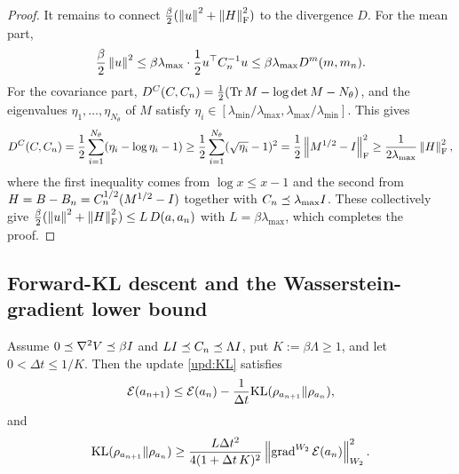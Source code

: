 \begin{proof}
    It remains to connect $\tfrac\beta2(\left\lVert u\right\rVert^2+\left\lVert H\right\rVert_{\mathrm{F}}^2)$ to the divergence $D$. For
    the mean part,
    \begin{equation*}
        \frac\beta2\left\lVert u\right\rVert^2
        \leq\beta\lambda_{\max}\cdot\frac12u^\top C_n^{-1}u
        \leq\beta\lambda_{\max}D^m(m,m_n).
    \end{equation*}
    For the covariance part, $D^C(C,C_n)=\tfrac12(\operatorname{Tr} M-\log\det M-N_\theta)$, and the
    eigenvalues $\eta_1,\ldots,\eta_{N_\theta}$ of $M$ satisfy
    $\eta_i\in[\lambda_{\min}/\lambda_{\max},\lambda_{\max}/\lambda_{\min}]$. This gives
    \begin{equation*}
        D^C(C,C_n)
        =\frac12\sum_{i=1}^{N_\theta}(\eta_i-\log\eta_i-1)
        \geq\frac12\sum_{i=1}^{N_\theta}(\sqrt{\eta_i}-1)^2
        =\frac12\left\lVert M^{1/2}-I\right\rVert_{\mathrm{F}}^2
        \geq\frac1{2\lambda_{\max}}\left\lVert H\right\rVert_{\mathrm{F}}^2,
    \end{equation*}
    where the first inequality comes from $\log x\leq x-1$ and the second from
    $H=B-B_n=C_n^{1/2}(M^{1/2}-I)$ together with $C_n\preceq\lambda_{\max}I$. These
    collectively give
    $\tfrac\beta2(\left\lVert u\right\rVert^2+\left\lVert H\right\rVert_{\mathrm{F}}^2)\leq L\,D(a,a_n)$ with $L=\beta\lambda_{\max}$,
    which completes the proof.
\end{proof}

\subsection{Forward-KL descent and the Wasserstein-gradient lower bound}

\begin{proposition}\label{prop:onestep-KL}
    Assume $0\preceq\nabla^2V\preceq\beta I$ and $LI\preceq C_n\preceq\Lambda I$, put
    $K:=\beta\Lambda\geq1$, and let $0<\Delta t\leq1/K$. Then the update \eqref{upd:KL}
    satisfies
    \begin{equation*}
        \mathcal{E}(a_{n+1})\leq\mathcal{E}(a_n)-\frac1{\Delta t}\mathrm{KL}(\rho_{a_{n+1}}\|\rho_{a_n}),
    \end{equation*}
    and
    \begin{equation*}
        \mathrm{KL}(\rho_{a_{n+1}}\|\rho_{a_n})
        \geq
        \frac{L\Delta t^2}{4(1+\Delta t\,K)^2}
        \left\lVert \operatorname{grad}^{W_2}\mathcal{E}(a_n)\right\rVert_{W_2}^2 .
    \end{equation*}
\end{proposition}

